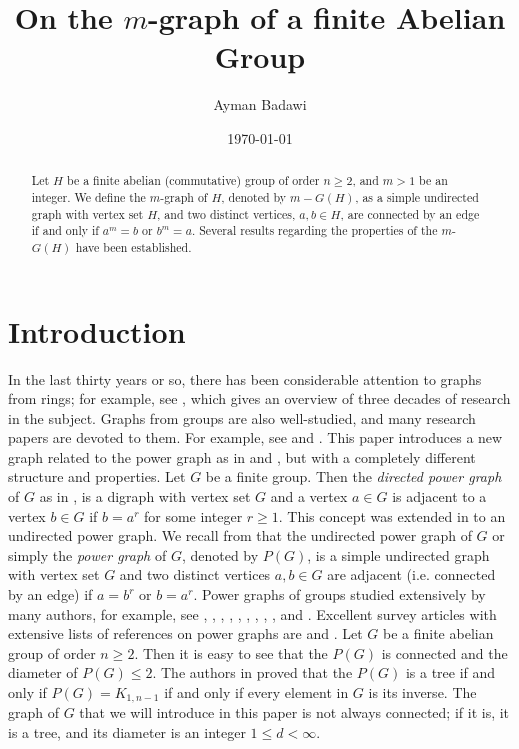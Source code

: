 \documentclass{amsart}
\theoremstyle{plain}
\begin{document}
		\title {On the $m$-graph of a finite Abelian Group}
		\author{ Ayman Badawi}
	\address{department of Mathematics  $\&$ Statistics, The American University of Sharjah, P.O.  Box 26666, Sharjah, United Arab Emirates.}
	\date{\today}

\begin{abstract} Let $H$ be a finite abelian (commutative) group of order $n \geq 2$, and $m >1$ be an integer. We define the $m$-graph of $H$, denoted by $m-G(H)$, as a simple undirected graph with vertex set $H$, and two distinct vertices, $a, b \in H$, are connected by an edge if and only if $a^m = b$ or $b^m = a$. Several results regarding the properties of the $m$-$G(H)$ have been established. 
\end{abstract}
\maketitle
\section{Introduction}
 In the last thirty years or so, there has been considerable attention to graphs from rings; for example, see \cite{B1}, which gives an overview of three decades of research in the subject.  Graphs from groups are also well-studied, and many research papers are devoted to them.  For example, see \cite{AS} and \cite{T1}.  This paper introduces a new graph related to the power graph as in \cite{K1} and \cite{C1}, but with a completely different structure and properties. Let $G$ be a finite group. Then the {\it directed power graph} of $G$ as in \cite{K1}, is a digraph with vertex set $G$ and a vertex $a\in G$ is adjacent to a vertex $b\in G$ if $b = a^r$ for some integer $ r\geq 1$. This concept was extended in \cite{C1} to an undirected power graph. We recall from \cite{C1} that the undirected power graph of $G$ or simply the {\it power graph} of $G$, denoted by $P(G)$, is a simple undirected graph with vertex set $G$ and two distinct vertices $a, b \in G$ are adjacent (i.e. connected by an edge) if $a = b^r$ or $b = a^r$. Power graphs of groups studied extensively by many authors, for example, see \cite{A1}, \cite{C0}, \cite{C1}, \cite{K1}, \cite{K2}, \cite{P1}, \cite{P2}, \cite{P3}, \cite{P4}, and \cite{T1}. Excellent survey articles with extensive lists of references on power graphs are \cite{A1} and \cite{C0}. Let $G$ be a finite abelian group of order $n \geq 2$. Then it is easy to see that the $P(G)$ is connected and the diameter of $P(G) \leq 2$. The authors in \cite[Theorem 4]{T1} proved that the $P(G)$ is a tree if and only if $P(G) = K_{1, n-1}$ if and only if every element in $G$ is its inverse.  The graph of $G$ that we will introduce in this paper is not always connected; if it is, it is a tree, and its diameter is an integer $1 \leq d < \infty$.  
 
\end{document}
